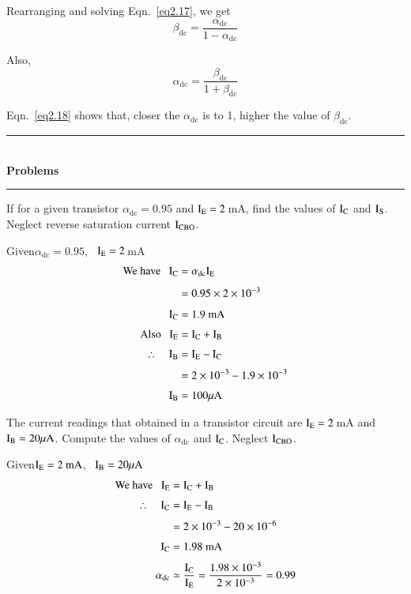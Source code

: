 Rearranging and solving Eqn.~\eqref{eq2.17}, we get
\begin{equation}
\beta_{\text{dc}}=\dfrac{\alpha_{\text{dc}}}{1-\alpha_{\text{dc}}}\label{eq2.18}
\end{equation}

Also,
\begin{equation}
\alpha_{\text{dc}}=\dfrac{\beta_{\text{dc}}}{1+\beta_{\text{dc}}}\label{eq2.19}
\end{equation}

Eqn.~\eqref{eq2.18} shows that, closer the $\alpha_{\text{dc}}$ is to 1, higher the value of $\beta_{\text{dc}}$.

\begin{center}
\rule{4cm}{1pt}\\
{\bf\Large Problems}\\[-3pt]
\rule{4cm}{1pt}
\end{center}

\begin{problem}\label{prop2.1}
If for a given transistor $\alpha_{\text{dc}}=0.95$ and $\textrm{I}_{\textrm{E}}=2$\,mA, find the values of $\textrm{I}_{\textrm{C}}$ and $\textrm{I}_{\textrm{S}}$. Neglect reverse saturation current $\textrm{I}_{\text{CBO}}$.
\end{problem}

\begin{solution}
Given\quad $\alpha_{\text{dc}}=0.95$, \ $\textrm{I}_{\textrm{E}}=2$\,mA
\begin{align*}
\text{We have~~ } \textrm{I}_{\textrm{C}} &= \alpha_{\text{dc}}\textrm{I}_{\textrm{E}}\\[4pt]
&= 0.95\times 2\times 10^{-3}\\[4pt]
\textrm{I}_{\textrm{C}} &= 1.9\text{~mA}\\[3pt]
\text{Also~~ } \textrm{I}_{\textrm{E}} &= \textrm{I}_{\textrm{C}}+\textrm{I}_{\textrm{B}}\\[3pt]
\therefore\quad \textrm{I}_{\textrm{B}} &= \textrm{I}_{\textrm{E}}-\textrm{I}_{\textrm{C}}\\[3pt]
&= 2\times 10^{-3}-1.9\times 10^{-3}\\[3pt]
\textrm{I}_{\textrm{B}} &= 100\mu\textrm{A}
\end{align*}
\end{solution}

\begin{problem}\label{prob2.2}
The current readings that obtained in a transistor circuit are $\textrm{I}_{\textrm{E}}=2$\,mA and $\textrm{I}_{\textrm{B}}=20\mu\textrm{A}$. Compute the values of $\alpha_{\text{dc}}$ and $\textrm{I}_{\textrm{C}}$. Neglect $\textrm{I}_{\text{CBO}}$.
\end{problem}

\begin{solution}
Given\quad $\textrm{I}_{\textrm{E}}=2\text{~mA}$, \ $\textrm{I}_{\textrm{B}}=20\mu\textrm{A}$
\begin{align*}
\text{We have~~ } \textrm{I}_{\textrm{E}} &= \textrm{I}_{\textrm{C}}+\textrm{I}_{\textrm{B}}\\[3pt]
\therefore\quad \textrm{I}_{\textrm{C}} &= \textrm{I}_{\textrm{E}}-\textrm{I}_{\textrm{B}}\\[3pt]
&= 2\times 10^{-3}-20\times 10^{-6}\\[3pt]
\textrm{I}_{\textrm{C}} &= 1.98\text{~mA}\\[3pt]
\alpha_{\text{dc}} &\simeq \frac{\textrm{I}_{\textrm{C}}}{\textrm{I}_{\textrm{E}}}=\dfrac{1.98\times 10^{-3}}{2\times 10^{-3}}=0.99
\end{align*}
\end{solution}

